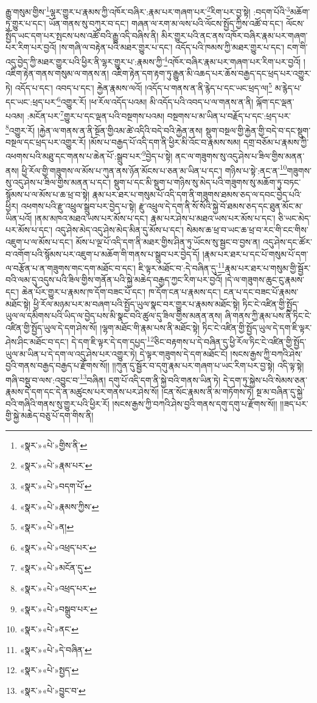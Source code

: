 རྒྱུ་གསུམ་གྱིས་\footnote{«སྣར་»«པེ་»གྱིས་ནི་}ལྷར་གྱུར་པ་རྣམས་ཀྱི་འཁོར་བཞིར་:རྣམ་པར་གཞག་པར་\footnote{«སྣར་»«པེ་»རྣམ་པར་}རིག་པར་བྱ་སྟེ། :བདག་པོའི་\footnote{«སྣར་»«པེ་»བདག་པོ་}མཆོག་ཏུ་གྱུར་པ་དང་། ཡོན་གནས་སུ་བཀུར་བ་དང་། གཞན་ལ་རག་མ་ལས་པའི་ལོངས་སྤྱོད་ཀྱིས་འཚོ་བ་དང་། ལོངས་སྤྱོད་ཡང་དག་པར་སྤངས་པས་འཚོ་བའི་རྒྱུ་འདི་བཞིས་ནི། མིར་གྱུར་པའི་ནང་ནས་འཁོར་བཞིར་རྣམ་པར་གཞག་པར་རིག་པར་བྱའོ། །ས་གཞི་ལ་བརྟེན་པའི་མཐར་གྱུར་པ་དང་། འདོད་པའི་ཁམས་ཀྱི་མཐར་གྱུར་པ་དང་། ངག་གི་འདུ་བྱེད་ཀྱི་མཐར་གྱུར་པའི་ཕྱིར་ནི་ལྷར་གྱུར་པ་:རྣམས་ཀྱི་\footnote{«སྣར་»«པེ་»རྣམས་ཀྱིས་}འཁོར་བཞིར་རྣམ་པར་གཞག་པར་རིག་པར་བྱའོ། །འཇིག་རྟེན་གནས་གསུམ་ལ་གནས་ན། འཇིག་རྟེན་དག་རྟག་ཏུ་རྒྱུན་མི་འཆད་པར་ཆོས་བརྒྱད་དང་ཕྲད་པར་འགྱུར་ཏེ། འདོད་པ་དང་། འབད་པ་དང་། རྐྱེན་རྣམས་ལའོ། །འདོད་པ་གནས་ན་ནི་རྙེད་པ་དང་ཡང་ཕྲད་ལ།\footnote{«སྣར་»«པེ་»ན།} མ་རྙེད་པ་དང་ཡང་:ཕྲད་པར་\footnote{«སྣར་»«པེ་»འཕྲད་པར་}འགྱུར་རོ། །ཕ་རོལ་འདོད་པའམ། མི་འདོད་པའི་འབད་པ་ལ་གནས་ན་ནི། ལྐོག་དང་ལྡན་པའམ། :མངོན་པར་\footnote{«སྣར་»«པེ་»མངོན་དུ་}གྱུར་པ་དང་ལྡན་པའི་བསྔགས་པའམ། བསྔགས་པ་མ་ཡིན་པ་བརྗོད་པ་དང་:ཕྲད་པར་\footnote{«སྣར་»«པེ་»འཕྲད་པར་}འགྱུར་རོ། །རྐྱེན་ལ་གནས་ན་ནི་སྔོན་གྱིའམ་ཚེ་འདིའི་བདེ་བའི་རྐྱེན་ནས། སྡུག་བསྔལ་གྱི་རྐྱེན་གྱི་བདེ་བ་དང་སྡུག་བསྔལ་དང་ཕྲད་པར་འགྱུར་རོ། །མོས་པ་བརྒྱད་པོ་འདི་དག་ནི་ཕྱིར་མི་འོང་བ་རྣམས་སམ། དགྲ་བཅོམ་པ་རྣམས་ཀྱི་འཕགས་པའི་མཐུ་དང་གནས་པ་ཆེན་པོ་:སྒྲུབ་པར་\footnote{«སྣར་»«པེ་»བསྒྲུབ་པར་}བྱེད་པ་སྟེ། ནང་ལ་གཟུགས་སུ་འདུ་ཤེས་པ་ཟིལ་གྱིས་མནན་ནས། ཕྱི་རོལ་གྱི་གཟུགས་ལ་མོས་པ་ཀུན་ནས་ཉོན་མོངས་པ་ཅན་མ་ཡིན་པ་དང་། གཉིས་པ་སྟེ་:ནང་ན་\footnote{«སྣར་»«པེ་»ནང་}གཟུགས་སུ་འདུ་ཤེས་པ་ཟིལ་གྱིས་མནན་པ་དང་། སྡུག་པ་དང་མི་སྡུག་པ་གཉིས་སུ་མེད་པའི་གཟུགས་སུ་མཆོག་ཏུ་བཏང་སྙོམས་པ་ལ་མོས་པ་ཆ་ཕྲ་བ་སྟེ། རྣམ་པར་ཐར་པ་གསུམ་པོ་འདི་དག་ནི་གཟུགས་ཐམས་ཅད་ལ་དབང་བྱེད་པའི་ཕྱིར། འཕགས་པའི་རྫུ་འཕྲུལ་སྒྲུབ་པར་བྱེད་པ་སྟེ། རྫུ་འཕྲུལ་དེ་དག་ནི་སོ་སོའི་སྐྱེ་བོ་ཐམས་ཅད་དང་ཐུན་མོང་མ་ཡིན་པའོ། །ནམ་མཁའ་མཐའ་ཡས་པར་མོས་པ་དང་། རྣམ་པར་ཤེས་པ་མཐའ་ཡས་པར་མོས་པ་དང་། ཅི་ཡང་མེད་པར་མོས་པ་དང་། འདུ་ཤེས་མེད་འདུ་ཤེས་མེད་མིན་དུ་མོས་པ་དང་། སེམས་ཆ་ཕྲ་བ་ཡང་ཆ་ཕྲ་བ་རང་གི་ངང་གིས་འཇུག་པ་ལ་མོས་པ་དང་། མོས་པ་ལྔ་པོ་འདི་དག་ནི་མཐར་གྱིས་ཤིན་ཏུ་ཡོངས་སུ་སྦྱང་བ་བྱས་ན། འདུ་ཤེས་དང་ཚོར་བ་འགོག་པའི་སྙོམས་པར་འཇུག་པ་མཆོག་གི་གནས་པ་སྒྲུབ་པར་བྱེད་དོ། །རྣམ་པར་ཐར་པ་དང་པོ་གསུམ་པོ་དག་ལ་བརྩོན་པ་ན་གཟུགས་གང་དག་མཐོང་བ་དང་། ཇི་ལྟར་མཐོང་བ་:དེ་བཞིན་དུ་\footnote{«སྣར་»«པེ་»དེ་བཞིན་}རྣམ་པར་ཐར་པ་གསུམ་གྱི་སྦྱོར་བའི་ལམ་དུ་འདུས་པའི་ཟིལ་གྱིས་གནོན་པའི་སྐྱེ་མཆེད་བརྒྱད་ཀྱང་རིག་པར་བྱའོ། །དེ་ལ་གཟུགས་ཆུང་ངུ་རྣམས་དང་། ཆེན་པོར་གྱུར་པ་རྣམས་ཁ་དོག་བཟང་པོ་དང་། ཁ་དོག་ངན་པ་རྣམས་དང་། ངན་པ་དང་བཟང་པོ་རྣམས་མཐོང་སྟེ། ཕྱི་རོལ་མཉམ་པར་མ་བཞག་པའི་སྤྱོད་ཡུལ་སྣང་བར་གྱུར་པ་རྣམས་མཐོང་སྟེ། ཏིང་ངེ་འཛིན་གྱི་སྤྱོད་ཡུལ་ལ་དམིགས་པའི་ཡིད་ལ་བྱེད་པས་མི་སྣང་བའི་ཚུལ་དུ་ཟིལ་གྱིས་མནན་ནས། ཞི་གནས་ཀྱི་རྣམ་པས་ནི་ཏིང་ངེ་འཛིན་གྱི་སྤྱོད་ཡུལ་དེ་དག་ཤེས་སོ། །ལྷག་མཐོང་གི་རྣམ་པས་ནི་མཐོང་སྟེ། ཏིང་ངེ་འཛིན་གྱི་སྤྱོད་ཡུལ་དེ་དག་ཇི་ལྟར་ཤེས་ཤིང་མཐོང་བ་དང་། དེ་དག་ཇི་ལྟར་དེ་དག་དཔྱད་\footnote{«སྣར་»«པེ་»སྤྱད་}ཅིང་བརྟགས་པ་དེ་བཞིན་དུ་ཕྱི་རོལ་ཏིང་ངེ་འཛིན་གྱི་སྤྱོད་ཡུལ་མ་ཡིན་པ་དེ་དག་ལ་འདུ་ཤེས་པར་འགྱུར་ཏེ། དེ་ལྟར་གཟུགས་དེ་དག་མཐོང་ངོ། །སངས་རྒྱས་ཀྱི་བཀའི་ཤེས་བྱའི་གནས་བརྒྱད་བརྒྱད་པ་རྫོགས་སོ།། །།ཀུན་དུ་སྦྱོར་བ་དགུ་རྣམ་པར་གཞག་པ་ཡང་རིག་པར་བྱ་སྟེ། འདི་ལྟ་སྟེ། གཞི་བསྡུ་བ་ལས་:འབྱུང་བ་\footnote{«སྣར་»«པེ་»བྱུང་བ་}བཞིན། དགུ་པོ་འདི་དག་ནི་སྐྱེ་བའི་གནས་ཡིན་ཏེ། དེ་དག་ཏུ་སྐྱེས་པའི་སེམས་ཅན་རྣམས་དེ་དག་དང་དེ་ན་མཚུངས་པར་གནས་པར་ཤེས་སོ། །ངན་སོང་རྣམས་ནི་མ་གཏོགས་ཏེ། སྔ་མ་བཞིན་དུ་སྐྱེ་བའི་གཞིའི་གནས་སུ་གྱུར་པའི་ཕྱིར་རོ། །སངས་རྒྱས་ཀྱི་བཀའི་ཤེས་བྱའི་གནས་དགུ་དགུ་པ་རྫོགས་སོ།། །།ཟད་པར་གྱི་སྐྱེ་མཆེད་བཅུ་པོ་དག་གིས་ནི། 